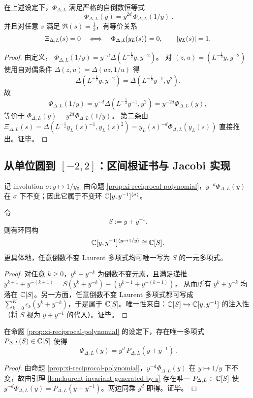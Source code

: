 \begin{proposition}\label{prop:xi-reciprocal-polynomial}
在上述设定下，$\Phi_{\Delta,L}$ 满足严格的自倒数恒等式
$$
\boxed{\ \Phi_{\Delta,L}(y)=y^{2d}\,\Phi_{\Delta,L}(1/y)\ }.
$$
并且对任意 $s$ 满足 $\Re(s)=\tfrac12$，有等价关系
$$
\Xi_{\Delta,L}(s)=0\quad\Longleftrightarrow\quad \Phi_{\Delta,L}\!\bigl(y_L(s)\bigr)=0,
\qquad \left\lvert y_L(s)\right\rvert=1.
$$
\end{proposition}
\begin{proof}
由定义，
$
\Phi_{\Delta,L}(1/y)=y^{-d}\Delta(L^{-\frac12}y,y^{-2})
$。
对 $(z,u)=(L^{-\frac12}y,y^{-2})$ 使用自对偶条件 $\Delta(z,u)=\Delta(uz,1/u)$ 得
$$
\Delta(L^{-\frac12}y,y^{-2})=\Delta(L^{-\frac12}y^{-1},y^2).
$$
故
$$
\Phi_{\Delta,L}(1/y)=y^{-d}\Delta(L^{-\frac12}y^{-1},y^2)=y^{-2d}\Phi_{\Delta,L}(y),
$$
等价于 $\Phi_{\Delta,L}(y)=y^{2d}\Phi_{\Delta,L}(1/y)$。
第二条由 $\Xi_{\Delta,L}(s)=\Delta(L^{-\frac12}y_L(s)^{-1},y_L(s)^2)=y_L(s)^{-d}\Phi_{\Delta,L}(y_L(s))$ 直接推出。证毕。
\end{proof}

\subsection{从单位圆到 \texorpdfstring{$[-2,2]$}{[-2,2]}：区间根证书与 Jacobi 实现}\label{subsec:xi-interval-certificate}
记 involution $\sigma:y\mapsto 1/y$。由命题 \ref{prop:xi-reciprocal-polynomial}，$y^{-d}\Phi_{\Delta,L}(y)$ 在 $\sigma$ 下不变；因此它属于不变环
$
\mathbb{C}[y,y^{-1}]^{\langle\sigma\rangle}
$。

\begin{lemma}\label{lem:laurent-invariant-generated-by-s}
令
$$
S:=y+y^{-1}.
$$
则有环同构
$$
\mathbb{C}[y,y^{-1}]^{\langle y\mapsto 1/y\rangle}\cong \mathbb{C}[S].
$$
更具体地，任意倒数不变 Laurent 多项式均可唯一写为 $S$ 的一元多项式。
\end{lemma}
\begin{proof}
对任意 $k\ge 0$，$y^k+y^{-k}$ 为倒数不变元素，且满足递推
$
y^{k+1}+y^{-(k+1)}=S(y^k+y^{-k})-(y^{k-1}+y^{-(k-1)})
$，
从而所有 $y^k+y^{-k}$ 均落在 $\mathbb{C}[S]$。另一方面，任意倒数不变 Laurent 多项式都可写成 $\sum_{k=0}^{K} c_k (y^k+y^{-k})$，于是属于 $\mathbb{C}[S]$。唯一性来自：$\mathbb{C}[S]\hookrightarrow \mathbb{C}[y,y^{-1}]$ 的注入性（将 $S$ 视为 $y+y^{-1}$ 的代入）。证毕。
\end{proof}

\begin{proposition}[自倒数多项式的区间化表示]\label{prop:reciprocal-to-interval-polynomial}
在命题 \ref{prop:xi-reciprocal-polynomial} 的设定下，存在唯一多项式 $P_{\Delta,L}(S)\in\mathbb{C}[S]$ 使得
$$
\boxed{\ \Phi_{\Delta,L}(y)=y^d\,P_{\Delta,L}(y+y^{-1})\ }.
$$
\end{proposition}
\begin{proof}
由命题 \ref{prop:xi-reciprocal-polynomial}，$y^{-d}\Phi_{\Delta,L}(y)$ 在 $y\mapsto 1/y$ 下不变，故由引理 \ref{lem:laurent-invariant-generated-by-s} 存在唯一 $P_{\Delta,L}\in\mathbb{C}[S]$ 使 $y^{-d}\Phi_{\Delta,L}(y)=P_{\Delta,L}(y+y^{-1})$。两边同乘 $y^d$ 即得。证毕。
\end{proof}

